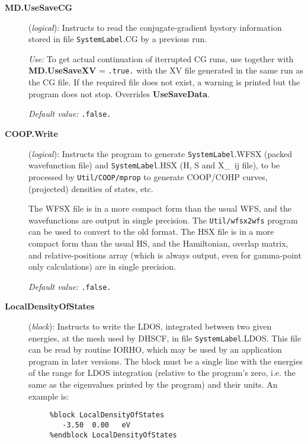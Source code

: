 \documentclass[11pt]{article}
\begin{document}
\begin{description}
 

\item[{\bf MD.UseSaveCG}] ({\it logical}): 
Instructs to read the conjugate-gradient hystory information stored
in file {\tt SystemLabel}.CG by a previous run.

{\it Use:} To get actual continuation of iterrupted CG runs, use
together with {\bf MD.UseSaveXV} = {\tt .true.} with the XV
file generated in the same run as the CG file.
If the required file does not exist, a warning is
printed but the program does not stop. Overrides {\bf UseSaveData}.

{\it Default value:} {\tt .false.}
        

        

\item[{\bf COOP.Write}] ({\it logical}): 
Instructs the program to generate  {\tt SystemLabel}.WFSX (packed
wavefunction file) and  {\tt SystemLabel}.HSX (H, S and X\_~{ij} file),
to be processed by {\tt Util/COOP/mprop} to generate COOP/COHP curves,
(projected) densities of states, etc.

The WFSX file is in a more compact form than the usual WFS, and the
wavefunctions are output in single precision. The {\tt Util/wfsx2wfs}
program can be used to convert to the old format.
The HSX file is in a more compact form than the usual HS, and the
Hamiltonian, overlap matrix, and relative-positions array (which is
always output, even for gamma-point only calculations) are in
single precision.

{\it Default value:} {\tt .false.}
        
\item[{\bf LocalDensityOfStates}] ({\it block}): 
Instructs to write the LDOS, integrated between two given energies,
at the mesh used by DHSCF,
in file {\tt SystemLabel}.LDOS. This file can be read by routine IORHO,
which may be used by an application program in later versions.
The block must be a single line with the energies of the range for 
LDOS integration
(relative to the program's zero, i.e. the same as the eigenvalues
printed by the program) and their units.
An example is:

\begin{verbatim}
     %block LocalDensityOfStates
        -3.50  0.00   eV
     %endblock LocalDensityOfStates
\end{verbatim}


\end{description}
\end{document}
